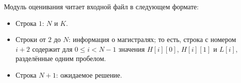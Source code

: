 Модуль оценивания читает входной файл в следующем формате: 

\begin{itemize}
\item Строка $1$: $N$ и $K$. 
\item Строки от $2$ до $N$: информация о магистралях; то есть, строка с номером $i+2$ содержит для $0 \le i < N-1$ значения $H[i][0]$, $H[i][1]$ и $L[i]$, разделённые одним пробелом. 
\item Строка $N+1$: ожидаемое решение.
\end{itemize}